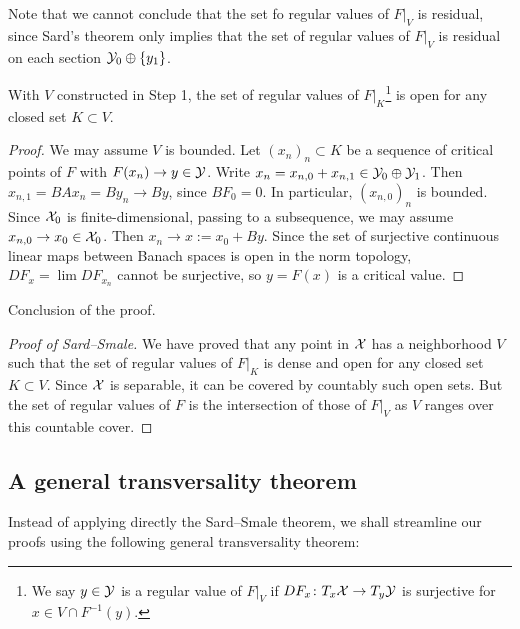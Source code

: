 Note that we cannot conclude that the set fo regular values 
of $F |_V$ is residual, since Sard's theorem only implies that 
the set of regular values of $F |_V$ is residual on each section 
${\mathcal{Y}}_0 \oplus \{ y_1 \}$.

\begin{step}{2}
	With $V$ constructed in Step 1, the set of regular values 
	of $F |_K$\footnote{We say $y \in {\mathcal{Y}}$ is a regular value 
	of $F |_V$ if $DF_x \colon T_x {\mathcal{X}} \to T_y {\mathcal{Y}}$ is surjective 
	for $x \in V \cap F^{-1} (y)$.} 
	is open for any closed set $K \subset V$.
\end{step}
\begin{proof}
	We may assume $V$ is bounded. 
	Let $(x_n)_n \subset K$ be a sequence of critical points of $F$ 
	with $F(x_n) \to y \in {\mathcal{Y}}$. 
	Write $x_n = x_{n, 0} + x_{n, 1} \in {\mathcal{Y}}_0 \oplus {\mathcal{Y}}_1$. 
	Then $x_{n, 1} = BA x_n = B y_n \to By$, since $BF_0 = 0$. 
	In particular, $( x_{n, 0} )_n$ is bounded. 
	Since ${\mathcal{X}}_0$ is finite-dimensional, passing to a subsequence, 
	we may assume $x_{n, 0} \to x_0 \in {\mathcal{X}}_0$. 
	Then $x_n \to x := x_0 + By$. 
	Since the set of surjective continuous linear maps 
	between Banach spaces is open in the norm topology, 
	$DF_x = \lim DF_{x_n}$ cannot be surjective, 
	so $y = F(x)$ is a critical value.
\end{proof}

\begin{step}{3}
	Conclusion of the proof.
\end{step}
\begin{proof}[Proof of Sard--Smale]
	We have proved that any point in ${\mathcal{X}}$ has a neighborhood $V$ 
	such that the set of regular values of $F |_K$ is dense and open 
	for any closed set $K \subset V$. 
	Since ${\mathcal{X}}$ is separable, it can be covered 
	by countably such open sets. 
	But the set of regular values of $F$ is the intersection of those 
	of $F |_V$ as $V$ ranges over this countable cover.
\end{proof}

\subsection{A general transversality theorem}
Instead of applying directly the Sard--Smale theorem, 
we shall streamline our proofs using 
the following general transversality theorem:


